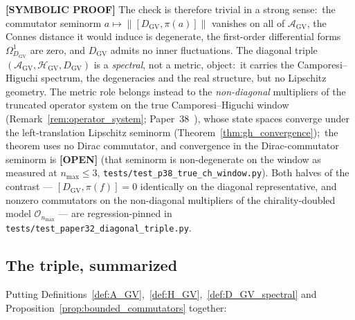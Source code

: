 \documentclass[11pt]{article}
\begin{document}
\textbf{[SYMBOLIC PROOF]} The check is therefore trivial in a strong
sense:\ the commutator seminorm $a \mapsto \|[D_{\mathrm{GV}},
\pi(a)]\|$ vanishes on all of $\mathcal{A}_{\mathrm{GV}}$, the Connes
distance it would induce is degenerate, the first-order differential
forms $\Omega^1_{D_{\mathrm{GV}}}$ are zero, and $D_{\mathrm{GV}}$
admits no inner fluctuations.  The diagonal triple
$(\mathcal{A}_{\mathrm{GV}}, \mathcal{H}_{\mathrm{GV}},
D_{\mathrm{GV}})$ is a \emph{spectral}, not a metric, object:\ it
carries the Camporesi--Higuchi spectrum, the degeneracies and the real
structure, but no Lipschitz geometry.  The metric role belongs
instead to the \emph{non-diagonal} multipliers of the truncated
operator system on the true Camporesi--Higuchi window
(Remark~\ref{rem:operator_system}; Paper~38~\cite{loutey_paper38}),
whose state spaces converge under the left-translation Lipschitz
seminorm (Theorem~\ref{thm:gh_convergence});\ the theorem uses no Dirac
commutator, and convergence in the Dirac-commutator seminorm is
\textbf{[OPEN]} (that seminorm is non-degenerate on the window as
measured at $n_{\max} \le 3$, \texttt{tests/test\_p38\_true\_ch\_window.py}).
Both halves of the contrast ---
$[D_{\mathrm{GV}}, \pi(f)] = 0$ identically on the diagonal
representative, and nonzero commutators on the non-diagonal multipliers
of the chirality-doubled model $\mathcal{O}_{n_{\max}}$ --- are
regression-pinned in \texttt{tests/test\_paper32\_diagonal\_triple.py}.

\subsection{The triple, summarized}

Putting Definitions~\ref{def:A_GV},~\ref{def:H_GV},~\ref{def:D_GV_spectral}
and Proposition~\ref{prop:bounded_commutators} together:
\end{document}
